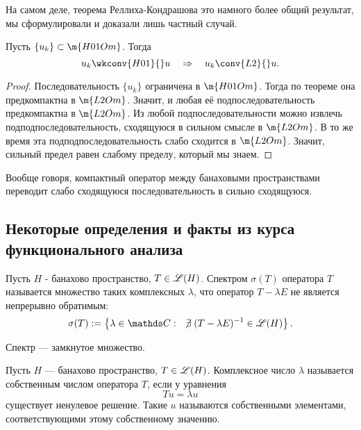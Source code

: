 \begin{note}
На самом деле, теорема Реллиха-Кондрашова это намного более общий результат, мы сформулировали и доказали лишь частный случай. 
\end{note}

\begin{corollary} Пусть $\{ u_k \} \subset \m{H01Om}$. Тогда
$$ u_k \wkconv{H01}{} u \quad \Rightarrow \quad u_k \conv{L2}{} u.$$
\end{corollary}
\begin{proof}
Последовательность $\{ u_k \}$ ограничена в $\m{H01Om}$. Тогда по теореме она предкомпактна в $\m{L2Om}$. Значит, и любая её подпоследовательность предкомпактна в $\m{L2Om}$. Из любой подпоследовательности можно извлечь подподпоследовательность, сходящуюся в сильном смысле в $\m{L2Om}$. В то же время эта подподпоследовательность слабо сходится в $\m{L2Om}$. Значит, сильный предел равен слабому пределу, который мы знаем.

\end{proof}

\begin{note} Вообще говоря, компактный оператор между банаховыми пространствами переводит слабо сходящуюся последовательность в сильно сходящуюся.
\end{note}

\subsection*{Некоторые определения и факты из курса функционального анализа}

\begin{definition} Пусть $H$ - банахово пространство, $T \in \mathscr{L}(H)$. Спектром $\sigma (T)$ оператора $T$ называется множество таких комплексных $\lambda$, что оператор $T - \lambda E$ не является непрерывно обратимым:
$$ \sigma(T) := \left\{ \lambda \in \complex : \quad \centernot\exists (T - \lambda E)^{-1} \in \linop(H) \right\}.$$
\end{definition}

\begin{note}
Спектр --- замкнутое множество.
\end{note}

\begin{definition} Пусть $H$ --- банахово пространство, $T \in \mathscr{L}(H)$. Комплексное число $\lambda$ называется собственным числом оператора $T$, если у уравнения
$$ Tu = \lambda u$$
существует ненулевое решение. Такие $u$ называются собственными элементами, соответствующими этому собственному значению.
\end{definition}

